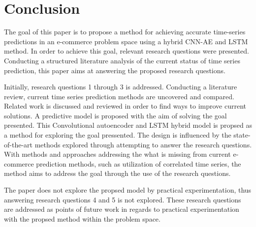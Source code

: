 \section{Conclusion}
\label{section:Discussion:Clonclusion}


The goal of this paper is to propose a method for achieving accurate time-series predictions in an e-commerce
problem space using a hybrid CNN-AE and LSTM method.
In order to achieve this goal, relevant research questions were presented.
Conducting a structured literature analysis of the current status of time series prediction,
this paper aims at answering the proposed research questions.

Initially, research questions 1 through 3 is addressed.
Conducting a literature review, current time series prediction methods are uncovered and compared.
Related work is discussed and reviewed in order to find ways to improve current solutions.
A predictive model is proposed with the aim of solving the goal presented.
This Convolutional autoencoder and LSTM hybrid model is propsed as a method for exploring the goal pressented.
The design is influenced by the state-of-the-art methods explored through attempting to answer the research questions.
With methods and approaches addressing the what is missing from current e-commerce prediction methods,
such as utilization of correlated time series, the method aims to address the goal through the use of the research questions.
 

The paper does not explore the propsed model by practical experimentation,
thus answering research questions 4 and 5 is not explored.
These research questions are addressed as points of future work in regards to
practical experimentation with the propsed method within the problem space.

